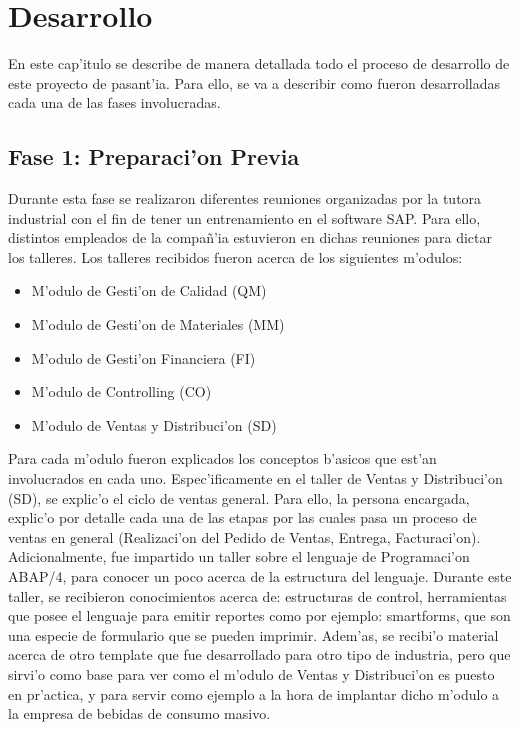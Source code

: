 \chapter{Desarrollo} \label{chap:desarrollo}
	En este cap'itulo se describe de manera detallada todo el proceso de desarrollo de este proyecto de pasant'ia. Para ello, se va a describir como fueron desarrolladas cada una de las fases involucradas.

\section{Fase 1: Preparaci'on Previa}
	Durante esta fase se realizaron diferentes reuniones organizadas por la tutora industrial con el fin de tener un entrenamiento en el software SAP. Para ello, distintos empleados de la compa\~n'ia estuvieron en dichas reuniones para dictar los talleres.
	Los talleres recibidos fueron acerca de los siguientes m'odulos:
\begin{itemize}
\item M'odulo de Gesti'on de Calidad (QM)
\item M'odulo de Gesti'on de Materiales (MM)
\item M'odulo de Gesti'on Financiera (FI)
\item M'odulo de Controlling (CO)
\item M'odulo de Ventas y Distribuci'on (SD)
\end{itemize}
	Para cada m'odulo fueron explicados los conceptos b'asicos que est'an involucrados en cada uno. Espec'ificamente en el taller de Ventas y Distribuci'on (SD), se explic'o el ciclo de ventas general. Para ello, la persona encargada, explic'o por detalle cada una de las etapas por las cuales pasa un proceso de ventas en general (Realizaci'on del Pedido de Ventas, Entrega, Facturaci'on). 
	Adicionalmente, fue impartido un taller sobre el lenguaje de Programaci'on ABAP/4, para conocer un poco acerca de la estructura del lenguaje. Durante este taller, se recibieron conocimientos acerca de: estructuras de control, herramientas que posee el lenguaje para emitir reportes como por ejemplo: smartforms, que son una especie de formulario que se pueden imprimir. 
	Adem'as, se recibi'o material acerca de otro template que fue desarrollado para otro tipo de industria, pero que sirvi'o como base para ver como el m'odulo de Ventas y Distribuci'on es puesto en pr'actica, y para servir como ejemplo a la hora de implantar dicho m'odulo a la empresa de bebidas de consumo masivo.
	
